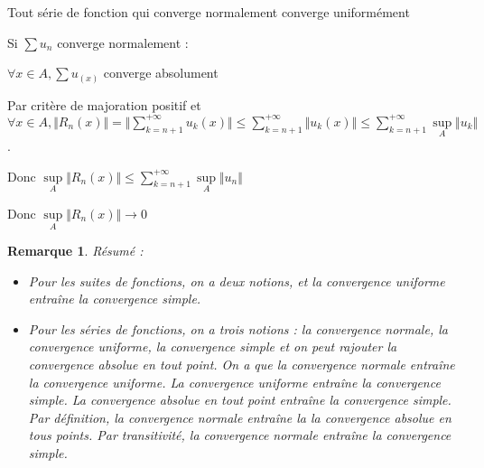\documentclass[a4paper,12pt]{book}
\newcommand{\Prop}[2]{\begin{tcolorbox}[sharp corners, colback=white,colframe=red!90!black!75, title=Proposition : #1]#2\end{tcolorbox}}
\newcommand{\Pre}[1]{\begin{tcolorbox}[sharp corners, colback=white,colframe=green!60!green!30!black!75, title=Preuve]#1\end{tcolorbox}}
\newtheorem{Rem}{Remarque}[section]
\begin{document}
\Prop{}{Tout série de fonction qui converge normalement converge uniformément}
\Pre{Si $\sum u_n$ converge normalement : \par $\forall x\in A,\sum u_(x)$ converge absolument \par Par critère de majoration positif et $\forall x\in A, \Vert R_n(x)\Vert=\Vert \sum\limits_{k=n+1}^{+\infty} u_k(x)\Vert\leq \sum\limits_{k=n+1}^{+\infty}\Vert u_k(x)\Vert\leq \sum\limits_{k=n+1}^{+\infty}\sup\limits_A\Vert u_k\Vert$.
\par Donc $\sup\limits_A \Vert R_n(x)\Vert\leq \sum\limits_{k=n+1}^{+\infty}\sup\limits_A\Vert u_n\Vert$ \par Donc $\sup\limits_A \Vert R_n(x)\Vert\to 0$}
\begin{Rem}
Résumé :\begin{itemize}
\item Pour les suites de fonctions, on a deux notions, et la convergence uniforme entraîne la convergence simple.
\item Pour les séries de fonctions, on a trois notions : la convergence normale, la convergence uniforme, la convergence simple et on peut rajouter la convergence absolue en tout point. On a que la convergence normale entraîne la convergence uniforme. La convergence uniforme entraîne la convergence simple. La convergence absolue en tout point entraîne la convergence simple. Par définition, la convergence normale entraîne la la convergence absolue en tous points. Par transitivité, la convergence normale entraîne la convergence simple. 
\end{itemize}\end{Rem}
\end{document}
